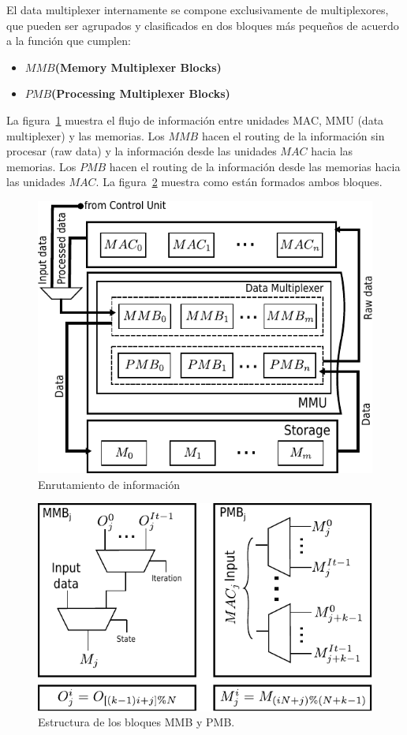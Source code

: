 El data multiplexer internamente se compone exclusivamente de multiplexores, que
pueden ser agrupados y clasificados en dos bloques más pequeños de acuerdo a la
función que cumplen: 

\begin{itemize}
 \item \textbf{$MMB$(Memory Multiplexer Blocks)}
  \item \textbf{$PMB$(Processing Multiplexer Blocks)}
\end{itemize}

La figura~\ref{mmu_routing} muestra el flujo de información entre unidades MAC,
MMU (data multiplexer) y las memorias. 
Los $MMB$ hacen el routing de la información sin procesar (raw data) y la
información desde las unidades $MAC$ hacia las memorias. 
Los $PMB$ hacen el routing de la información desde las memorias hacia las
unidades $MAC$. La figura~\ref{mmu_structure} muestra como están formados ambos
bloques.

\begin{figure}
\centering
\includegraphics[scale=0.9]{muxes}
\caption{Enrutamiento de información}\label{mmu_routing}
\end{figure}

\begin{figure}
\centering
\includegraphics{muxes_cont}
\caption{Estructura de los bloques MMB y PMB.}\label{mmu_structure}
\end{figure}

